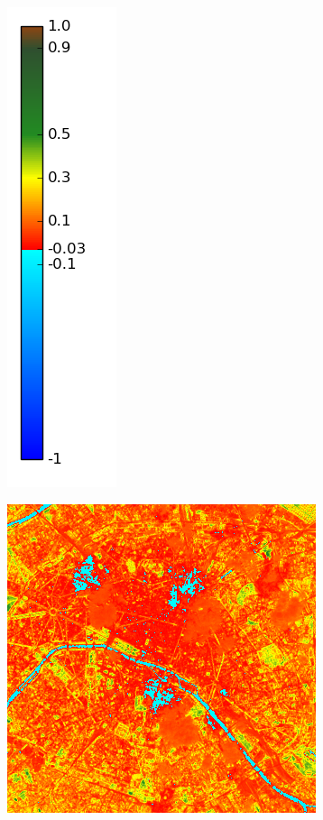 \documentclass{book}
\begin{document}
\begin{figure}[H]
{\includegraphics[scale=0.2]{images/colormap.png}
}
\centerline{
\includegraphics[scale=0.25]{images/Paris/08_ndvi.png}
}
\end{figure}
\end{document}
